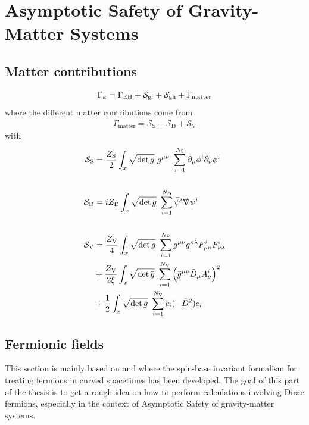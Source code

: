 \chapter{Asymptotic Safety of Gravity-Matter Systems}
\blindtext
\section{Matter contributions}
\begin{align}
	\Gamma_{k} = \Gamma_{\text{EH}} + \mathcal{S}_{\text{gf}}+ \mathcal{S}_{\text{gh}}+ \Gamma_{\text{matter}}
\end{align}
where the different matter contributions come from
\begin{align}
	\Gamma_{\text{matter}} = \mathcal{S}_{\text{S}} + \mathcal{S}_{\text{D}} + \mathcal{S}_{\text{V}} 
\end{align}
with 
\begin{align}
	\mathcal{S}_{\text{S}} &= \frac{Z_{\text{S}}}{2}\int_x \sqrt{\operatorname{det}g} \ g^{\mu\nu} \ \sum\limits_{i=1}^{N_{\text{S}}} \partial_{\mu}\phi^{i}\partial_{\nu}\phi^{i} \\
	\phantom{.}\nonumber\\
	\mathcal{S}_{\text{D}} &= iZ_{\text{D}}\int_x \sqrt{\operatorname{det}g} \ \sum\limits_{i=1}^{N_{\text{D}}} \bar{\psi}^{i}\slashed{\nabla}\psi^{i}\\
	\phantom{.}\nonumber\\
		\mathcal{S}_{\text{V}} &= \frac{Z_{\text{V}}}{4}\int_x \sqrt{\operatorname{det}g} \ \sum\limits_{i=1}^{N_{\text{V}}} g^{\mu\nu}g^{\kappa\lambda}F^{i}_{\mu\kappa}F^{i}_{\nu\lambda} \nonumber \\
		&+ \frac{Z_{\text{V}}}{2\xi}\int_x \sqrt{\operatorname{det}\bar{g}} \ \sum\limits_{i=1}^{N_{\text{V}}} \left(\bar{g}^{\mu\nu}\bar{D}_{\mu}A_{\nu}^{i}\right)^2  \\
		&+ \frac{1}{2}\int_x \sqrt{\operatorname{det}\bar{g}} \ \sum\limits_{i=1}^{N_{\text{V}}} \bar{c}_i(-\bar{D}^2)c_i \nonumber
\end{align}
\section{Fermionic fields}
This section is mainly based on \cite{LippoldtPHD} and \cite{Lippoldt2015} where the spin-base invariant formalism for treating fermions in curved spacetimes has been developed. The goal of this part of the thesis is to get a rough idea on how to perform calculations involving Dirac fermions, especially in the context of Asymptotic Safety of gravity-matter systems.  

